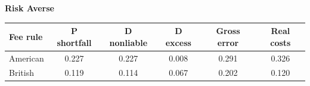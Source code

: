 \documentclass[10pt,border=5pt,varwidth=17cm]{standalone}
\begin{document}
\begingroup
\small
\setlength{\tabcolsep}{5pt}
\renewcommand{\arraystretch}{1.20}
\noindent\textbf{Risk Averse}\par\smallskip
\noindent\begin{tabularx}{\linewidth}{@{}>{\raggedright\arraybackslash}Xccccc@{}}
\toprule
\textbf{Fee rule} & \textbf{P shortfall} & \textbf{D nonliable} & \textbf{D excess} & \textbf{Gross error} & \textbf{Real costs} \\
\midrule
American & 0.227 & 0.227 & 0.008 & 0.291 & 0.326 \\
British & 0.119 & 0.114 & 0.067 & 0.202 & 0.120 \\
\bottomrule\end{tabularx}\par\medskip
\endgroup
\end{document}
